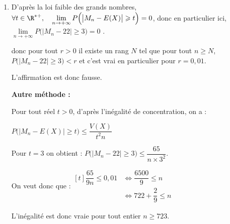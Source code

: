 \begin{enumerate}
\begin{enumerate}
		\item %
		L'événement \og  $19 <M_{50}< 25$ \fg{} revient à $\left|M_{50} - 22 \right| < 3$ et

$P\big(\left|M_{50} - 22 \right| < 3\big) = 1 - P\big(\left|M_{50} - 22 \right| \geqslant 3\big)$.

Soit $P\big(\left|M_{50} - 22 \right| \geqslant 3\big) \leqslant \dfrac{13}{90}$ entraîne $P\big(19 < M_{50} < 25 \big) \geqslant 1 - \dfrac{13}{90} = \dfrac{77}{90} \approx 0,856$ : cette probabilité est bien supérieure à 0,85.
	\end{enumerate}


\item %
%

D'après la loi faible des grands nombres, $\forall t \in \R^{*+}, \quad \lim\limits_{n \to +\infty} P\Big(\big|M_n - E(X)\big| \geqslant t\Big) = 0$, donc en particulier ici,  $\lim\limits_{n \to +\infty} P\Big(\big|M_n - 22\big| \geqslant 3\Big) = 0$ .


donc pour tout $r>0$ il existe un rang $N$ tel que pour tout $n \geqslant N$, $P\big(\left|M_{n}-22\right| \geqslant 3\big)< r$ et c'est vrai en particulier pour $r=0,01$.


L'affirmation est donc fausse.

\textbf{Autre méthode : }

Pour tout réel $t>0$, d'après l'inégalité de  concentration, on a :

$ P\big(\left|M_n-E(X)\right| \geqslant t\big) \leqslant \dfrac{V(X)}{t^2 n}$

	Pour $t=3$ on obtient :  $ P\big(|M_n-22| \geqslant 3\big)\leqslant \dfrac{65}{ n \times 3^2}$.



On veut donc que  :\quad $\begin{aligned}[t]
	 \dfrac{65}{9 n} \leqslant 0,01 &\iff
	 \dfrac{6500}{9} \leqslant n \\
	 &\iff 722+\dfrac{2}{9}\leqslant n
\end{aligned}$

L'inégalité est donc vraie pour tout entier $n \geqslant 723$.



\end{enumerate}



\bigskip

